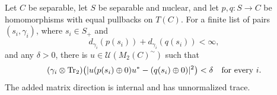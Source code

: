 \begin{lemma}\label{un:finite-traces}
Let $C$ be separable, let $S$ be separable and nuclear, and let
$p,q:S\to C$ be homomorphisms with equal pullbacks on $T(C)$.
For a finite list of pairs $(s_i,\gamma_i)$, where $s_i\in S_+$ and
\[
 d_{\gamma_i}(p(s_i))+d_{\gamma_i}(q(s_i))<\infty,
\]
and any $\delta>0$, there is $u\in\mathcal U(M_2(C)^{\sim})$ such that
\begin{equation}\label{un:finite-L2}
 (\gamma_i\otimes\operatorname{Tr}_2)
 \bigl(\lvert u(p(s_i)\oplus0)u^*-(q(s_i)\oplus0)\rvert^2\bigr)<\delta
 \quad\text{for every }i.
\end{equation}
The added matrix direction is internal and has unnormalized trace.
\end{lemma}

